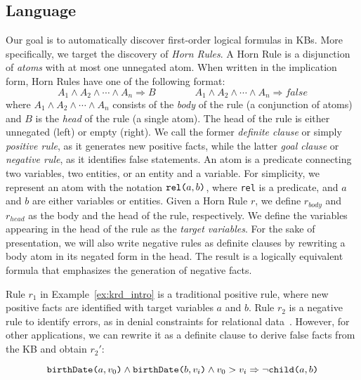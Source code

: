 \subsection{Language} \label{sec:krd_language} 
Our goal is to automatically discover first-order logical formulas in KBs. More specifically, we target the discovery of \emph{Horn Rules}. A Horn Rule is a disjunction of \emph{atoms} with at most one unnegated atom. When written in the implication form, Horn Rules have one of the following format:
%
\begin{equation*}
	A_1 \wedge A_2 \wedge \cdots \wedge A_n \Rightarrow B \qquad \qquad A_1 \wedge A_2 \wedge \cdots \wedge A_n \Rightarrow  false 
\end{equation*} %
%
where $A_1 \wedge A_2 \wedge \cdots \wedge A_n$ consists of the \emph{body} of the rule (a conjunction of atoms) and $B$ is the \emph{head} of the rule (a single atom). The head of the rule is either unnegated (left) or empty (right). We call the former \emph{definite clause} or simply \emph{positive rule}, as it generates new positive facts, while the latter \emph{goal clause} or \emph{negative rule}, as it identifies false statements. %
An atom is a predicate connecting two variables, two entities, or an entity and a variable. For simplicity, we represent an atom with the notation $\texttt{rel(}a,b\texttt{)}$, where \texttt{rel} is a predicate, and $a$ and $b$ are either variables or entities. 
Given a Horn Rule $r$, we define $r_{body}$ and $r_{head}$ as the body and the head of the rule, respectively. We define the variables appearing in the head of the rule as the \emph{target variables}. 
For the sake of presentation, we will also write negative rules as definite clauses by rewriting a body atom in its negated form in the head. The result is a logically equivalent formula that emphasizes the generation of negative facts.

\begin{example}\label{ex:ex2}
	Rule $r_1$ in Example~\ref{ex:krd_intro} is a traditional positive rule, where new positive facts are identified with target variables $a$ and $b$.
	Rule $r_2$ is a negative rule to identify errors, as in denial constraints for relational data~\cite{chu2013discovering}. However, for other applications, we can rewrite it as a definite clause to derive false facts from the KB and obtain $r_2'$:
	
	\vspace{-3.5ex}
	{\small	
		\begin{equation*}
			\texttt{birthDate(}a,v_0\texttt{)} \wedge \texttt{birthDate(}b,v_i\texttt{)} \wedge v_0 > v_i
			\Rightarrow  \neg \texttt{child(}a,b\texttt{)}  
		\end{equation*}
	}
	\vspace{-2.5ex}
\end{example} 

